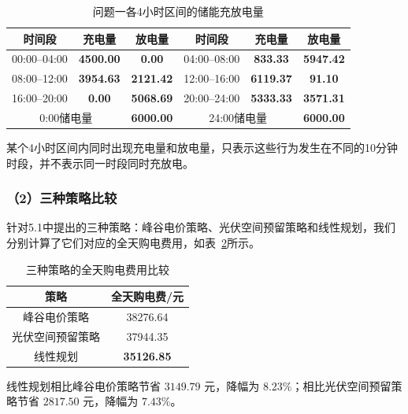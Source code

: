 \begin{table}[H]
    \centering
    \caption{问题一各4小时区间的储能充放电量}
    \label{tab:q1_storage_result}
    \begin{tabular}{|c|c|c|c|c|c|}
        \hline
        时间段 & 充电量 & 放电量 & 时间段 & 充电量 & 放电量 \\
        \hline
        00:00--04:00 & \textbf{4500.00} & \textbf{0.00} & 04:00--08:00 & \textbf{833.33} & \textbf{5947.42} \\
        \hline
        08:00--12:00 & \textbf{3954.63} & \textbf{2121.42} & 12:00--16:00 & \textbf{6119.37} & \textbf{91.10} \\
        \hline
        16:00--20:00 & \textbf{0.00} & \textbf{5068.69} & 20:00--24:00 & \textbf{5333.33} & \textbf{3571.31} \\
        \hline
        \multicolumn{2}{|c|}{0:00储电量} & \multicolumn{1}{|c|}{\textbf{6000.00}} & \multicolumn{2}{c|}{24:00储电量} & \multicolumn{1}{c|}{\textbf{6000.00}}\\
        \hline
    \end{tabular}
\end{table}

某个4小时区间内同时出现充电量和放电量，只表示这些行为发生在不同的10分钟时段，并不表示同一时段同时充放电。

\subsubsection*{（2）三种策略比较}

针对5.1中提出的三种策略：峰谷电价策略、光伏空间预留策略和线性规划，我们分别计算了它们对应的全天购电费用，如表~\ref{tab:q1_strategy_compare}所示。

\begin{table}[H]
    \centering
    \caption{三种策略的全天购电费用比较}
    \label{tab:q1_strategy_compare}
    \begin{tabular}{cc}
        \toprule
        策略 & 全天购电费/元 \\
        \midrule
        峰谷电价策略 & 38276.64 \\
        光伏空间预留策略 & 37944.35 \\
        线性规划 & \textbf{35126.85} \\
        \bottomrule
    \end{tabular}
\end{table}

线性规划相比峰谷电价策略节省 \(3149.79\) 元，降幅为 \(8.23\%\)；相比光伏空间预留策略节省 \(2817.50\) 元，降幅为 \(7.43\%\)。


